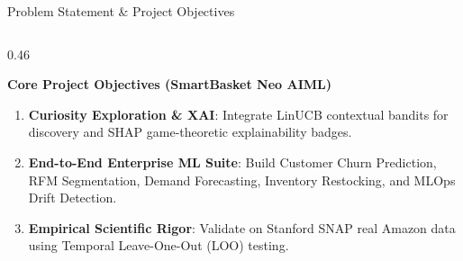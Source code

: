 \documentclass[10pt]{beamer}
\begin{document}
\begin{frame}{Problem Statement \& Project Objectives}
\begin{columns}[T]
\begin{column}{0.46\textwidth}
\begin{block}{\color{brandorange}\textbf{Core Project Objectives (SmartBasket Neo AIML)}}
\begin{enumerate}
                \item \textbf{Curiosity Exploration \& XAI}: Integrate LinUCB contextual bandits for discovery and SHAP game-theoretic explainability badges.
                \item \textbf{End-to-End Enterprise ML Suite}: Build Customer Churn Prediction, RFM Segmentation, Demand Forecasting, Inventory Restocking, and MLOps Drift Detection.
                \item \textbf{Empirical Scientific Rigor}: Validate on Stanford SNAP real Amazon data using Temporal Leave-One-Out (LOO) testing.
            \end{enumerate}
        \end{block}
    \end{column}
\end{columns}
\end{frame}
\end{document}
